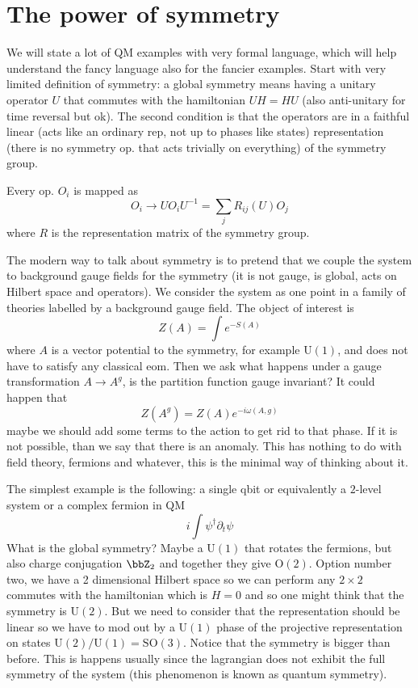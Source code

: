 \documentclass[11pt]{article}
\theoremstyle{definition}
\numberwithin{equation}{section}
\newcommand*\U{\mathrm{U}}
\newcommand*\SO{\mathrm{SO}}
\newcommand*\OO{\mathrm{O}}
\begin{document}
\section{The power of symmetry}
We will state a lot of QM examples with very formal language, which will help understand the fancy language also for the fancier examples. Start with very limited definition of symmetry: a global symmetry means having a unitary operator $U$ that commutes with the hamiltonian $UH=HU$ (also anti-unitary for time reversal but ok). The second condition is that the operators are in a faithful linear (acts like an ordinary rep, not up to phases like states) representation (there is no symmetry op. that acts trivially on everything) of the symmetry group. 

Every op. $O_{i}$ is mapped as 
\begin{equation}
	O_{i}\rightarrow U O_{i}U^{-1}=\sum_{j}R_{ij}(U)O_{j}
\end{equation}
where $R$ is the representation matrix of the symmetry group.

The modern way to talk about symmetry is to pretend that we couple the system to background gauge fields for the symmetry (it is not gauge, is global, acts on Hilbert space and operators). We consider the system as one point in a family of theories labelled by a background gauge field. The object of interest is 
\begin{equation}
	Z(A)=\int e^{-S(A)}
\end{equation}
where $A$ is a vector potential to the symmetry, for example $\U(1)$, and does not have to satisfy any classical eom. Then we ask what happens under a gauge transformation $A\rightarrow A^{g}$, is the partition function gauge invariant? It could happen that
\begin{equation}
	Z(A^{g})=Z(A)e^{-i\omega(A,g)}
\end{equation}
maybe we should add some terms to the action to get rid to that phase. If it is not possible, than we say that there is an anomaly. This has nothing to do with field theory, fermions and whatever, this is the minimal way of thinking about it.

The simplest example is the following: a single qbit or equivalently a $2$-level system or a complex fermion in QM
\begin{equation}
	i\int\psi^{\dagger}\partial_{t}\psi
\end{equation}
What is the global symmetry? Maybe a $\U(1)$ that rotates the fermions, but also charge conjugation $\bbZ_{2}$ and together they give $\OO(2)$. Option number two, we have a 2 dimensional Hilbert space so we can perform any $2\times 2$ commutes with the hamiltonian which is $H=0$ and so one might think that the symmetry is $\U(2)$. But we need to consider that the representation should be linear so we have to mod out by a $\U(1)$ phase of the projective representation on states $\U(2)/\U(1)=\SO(3)$. Notice that the symmetry is bigger than before. This is happens usually since the lagrangian does not exhibit the full symmetry of the system (this phenomenon is known as quantum symmetry).
\end{document}
